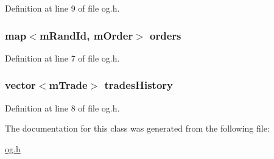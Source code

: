 Definition at line 9 of file og.\+h.

\subsubsection[{\texorpdfstring{orders}{orders}}]{\setlength{\rightskip}{0pt plus 5cm}map$<${\bf m\+Rand\+Id}, {\bf m\+Order}$>$ orders}\hypertarget{class_k_1_1_o_g_a3edc39f2b61ed046bfac9414042e54c4}{}\label{class_k_1_1_o_g_a3edc39f2b61ed046bfac9414042e54c4}


Definition at line 7 of file og.\+h.

\subsubsection[{\texorpdfstring{trades\+History}{tradesHistory}}]{\setlength{\rightskip}{0pt plus 5cm}vector$<${\bf m\+Trade}$>$ trades\+History}\hypertarget{class_k_1_1_o_g_a4b64cd03cacdbed4ca7d0b7151546441}{}\label{class_k_1_1_o_g_a4b64cd03cacdbed4ca7d0b7151546441}


Definition at line 8 of file og.\+h.



The documentation for this class was generated from the following file\+:\begin{DoxyCompactItemize}
\item 
\hyperlink{og_8h}{og.\+h}\end{DoxyCompactItemize}
